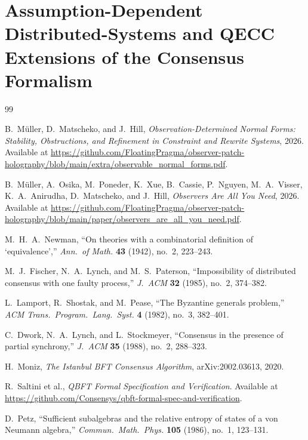 \documentclass[11pt]{article}
\theoremstyle{remark}
\theoremstyle{plain}
\begin{document}


\section{Assumption-Dependent Distributed-Systems and QECC Extensions of the Consensus Formalism}\label{app:bft-qecc}


\begin{thebibliography}{99}

B.~M\"uller, D.~Matscheko, and J.~Hill,
\emph{Observation-Determined Normal Forms: Stability, Obstructions, and Refinement in Constraint
and Rewrite Systems},
2026.\\
Available at \url{https://github.com/FloatingPragma/observer-patch-holography/blob/main/extra/observable_normal_forms.pdf}.

B.~M\"uller, A.~Osika, M.~Poneder, K.~Xue, B.~Cassie, P.~Nguyen, M.~A.~Visser, K.~A.~Anirudha, D.~Matscheko, and J.~Hill,
\emph{Observers Are All You Need},
2026.\\
Available at \url{https://github.com/FloatingPragma/observer-patch-holography/blob/main/paper/observers_are_all_you_need.pdf}.

M.~H.~A.~Newman,
``On theories with a combinatorial definition of `equivalence',''
\emph{Ann.\ of Math.} \textbf{43} (1942), no.~2, 223--243.

M.~J.~Fischer, N.~A.~Lynch, and M.~S.~Paterson,
``Impossibility of distributed consensus with one faulty process,''
\emph{J.\ ACM} \textbf{32} (1985), no.~2, 374--382.

L.~Lamport, R.~Shostak, and M.~Pease,
``The Byzantine generals problem,''
\emph{ACM Trans.\ Program.\ Lang.\ Syst.} \textbf{4} (1982), no.~3, 382--401.

C.~Dwork, N.~A.~Lynch, and L.~Stockmeyer,
``Consensus in the presence of partial synchrony,''
\emph{J.\ ACM} \textbf{35} (1988), no.~2, 288--323.

H.~Moniz,
\emph{The Istanbul BFT Consensus Algorithm},
arXiv:2002.03613, 2020.

R.~Saltini et al.,
\emph{QBFT Formal Specification and Verification}.
Available at \url{https://github.com/Consensys/qbft-formal-spec-and-verification}.

D.~Petz,
``Sufficient subalgebras and the relative entropy of states of a von Neumann algebra,''
\emph{Commun.\ Math.\ Phys.} \textbf{105} (1986), no.~1, 123--131.


\end{thebibliography}
\end{document}
